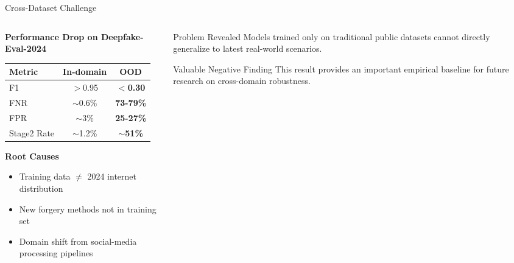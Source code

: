 \documentclass[aspectratio=169,12pt]{beamer}
\newcommand{\alerttext}[1]{\textcolor{alertred}{\textbf{#1}}}
\begin{document}
\begin{frame}{Cross-Dataset Challenge}
\begin{columns}[T]
\begin{column}{0.55\textwidth}
\textbf{Performance Drop on Deepfake-Eval-2024}

\begin{center}
\begin{tabular}{lcc}
\toprule
\textbf{Metric} & \textbf{In-domain} & \textbf{OOD} \\
\midrule
F1 & $>$0.95 & \alerttext{$<$0.30} \\
FNR & $\sim$0.6\% & \alerttext{73-79\%} \\
FPR & $\sim$3\% & \alerttext{25-27\%} \\
Stage2 Rate & $\sim$1.2\% & \alerttext{$\sim$51\%} \\
\bottomrule
\end{tabular}
\end{center}

\textbf{Root Causes}
\begin{itemize}
    \item Training data $\neq$ 2024 internet distribution
    \item New forgery methods not in training set
    \item Domain shift from social-media processing pipelines
\end{itemize}
\end{column}

\begin{column}{0.45\textwidth}
\begin{alertblock}{Problem Revealed}
Models trained only on traditional public datasets cannot directly generalize to latest real-world scenarios.
\end{alertblock}

\vspace{0.5em}
\begin{block}{Valuable Negative Finding}
This result provides an important empirical baseline for future research on cross-domain robustness.
\end{block}
\end{column}
\end{columns}
\end{frame}
\end{document}
